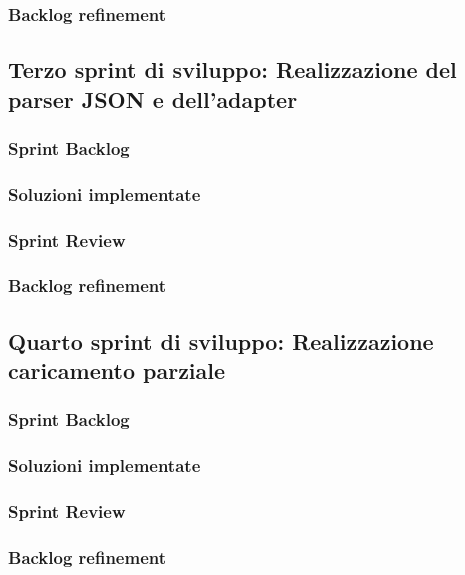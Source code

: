 \subsubsection{Backlog refinement}


\subsection{Terzo sprint di sviluppo: Realizzazione del parser JSON e dell'adapter}
\subsubsection{Sprint Backlog}
\subsubsection{Soluzioni implementate}
\subsubsection{Sprint Review}
\subsubsection{Backlog refinement}


\subsection{Quarto sprint di sviluppo: Realizzazione caricamento parziale}
\subsubsection{Sprint Backlog}
\subsubsection{Soluzioni implementate}
\subsubsection{Sprint Review}
\subsubsection{Backlog refinement}


